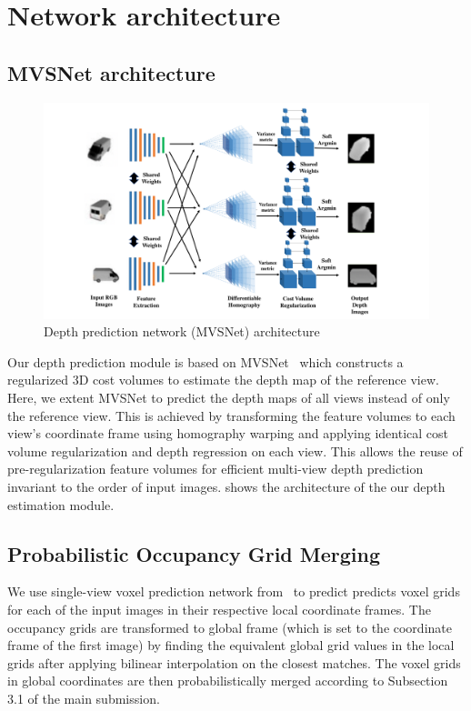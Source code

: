 \section{Network architecture}
\subsection{MVSNet architecture}
\label{subsec:mvsnet}

\begin{figure}[ht]
    \begin{center}
        \includegraphics[width=\linewidth]{imgs/MVSNet_architecture.png}
    \end{center}
    \caption{Depth prediction network (MVSNet) architecture}
    \label{fig:mvsnet_architecture}
\end{figure}

Our depth prediction module is based on MVSNet~\cite{yao2018mvsnet} which constructs a regularized 3D cost volumes
to estimate the depth map of the reference view.
Here, we extent MVSNet to predict the depth maps of all views instead of only the reference view.
This is achieved by transforming the feature volumes to each view's coordinate frame using homography warping
and applying identical cost volume regularization and depth regression on each view.
This allows the reuse of pre-regularization feature volumes for efficient multi-view depth prediction invariant to the order of input images.
 shows the architecture of the our depth estimation module.

\subsection{Probabilistic Occupancy Grid Merging}
We use single-view voxel prediction network from~\cite{gkioxari2019meshrcnn} to predict predicts voxel grids for each of the input images in their respective local coordinate frames.
The occupancy grids are transformed to global frame (which is set to the coordinate frame of the first image)
by finding the equivalent global grid values in the local grids after applying bilinear interpolation on the closest matches.
The voxel grids in global coordinates are then probabilistically merged according to Subsection 3.1 of the main submission.

